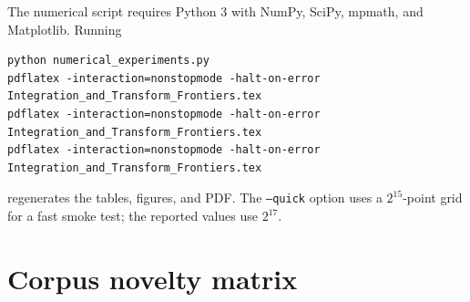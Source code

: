 \documentclass[11pt,oneside]{article}
\theoremstyle{definition}
\theoremstyle{remark}
\newcommand{\1}{\mathbf 1}
\begin{document}
The numerical script requires Python 3 with NumPy, SciPy, mpmath, and
Matplotlib.  Running
\begin{lstlisting}[style=pythonstyle]
python numerical_experiments.py
pdflatex -interaction=nonstopmode -halt-on-error Integration_and_Transform_Frontiers.tex
pdflatex -interaction=nonstopmode -halt-on-error Integration_and_Transform_Frontiers.tex
pdflatex -interaction=nonstopmode -halt-on-error Integration_and_Transform_Frontiers.tex
\end{lstlisting}
regenerates the tables, figures, and PDF.  The \texttt{--quick} option uses a
$2^{15}$-point grid for a fast smoke test; the reported values use $2^{17}$.

\section{Corpus novelty matrix}
\label{p11:app:corpus-matrix}
\end{document}

